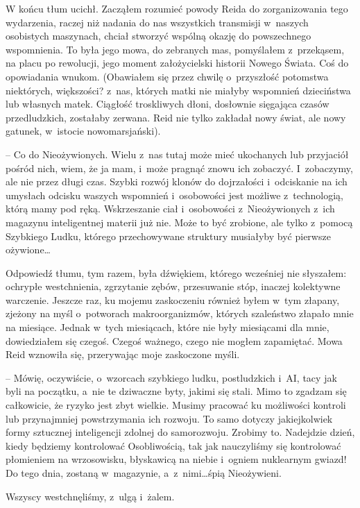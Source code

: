 \documentclass[oneside,polish,11pt,sfheadings]{mwbk}
\begin{document}
W końcu tłum ucichł. Zacząłem rozumieć powody Reida do zorganizowania
tego wydarzenia, raczej niż nadania do nas wszystkich transmisji w~naszych osobistych maszynach, chciał stworzyć wspólną okazję do
powszechnego wspomnienia. To była jego mowa, do zebranych mas,
pomyślałem z~przekąsem, na placu po rewolucji, jego moment założycielski
historii Nowego Świata. Coś do opowiadania wnukom. (Obawiałem się przez
chwilę o~przyszłość potomstwa niektórych, większości? z~nas, których
matki nie miałyby wspomnień dzieciństwa lub własnych matek. Ciągłość
troskliwych dłoni, dosłownie sięgająca czasów przedludzkich, zostałaby
zerwana. Reid nie tylko zakładał nowy świat, ale nowy gatunek, w~istocie
nowomarsjański).

-- Co do Nieożywionych. Wielu z~nas tutaj może mieć ukochanych lub
przyjaciół pośród nich, wiem, że ja mam, i~może pragnąć znowu ich
zobaczyć. I~zobaczymy, ale nie przez długi czas. Szybki rozwój klonów do
dojrzałości i~odciskanie na ich umysłach odcisku waszych wspomnień i~osobowości jest możliwe z~technologią, którą mamy pod ręką. Wskrzeszanie
ciał i~osobowości z~Nieożywionych z~ich magazynu inteligentnej materii
już nie. Może to być zrobione, ale tylko z~pomocą Szybkiego Ludku,
którego przechowywane struktury musiałyby być pierwsze ożywione\ldots

Odpowiedź tłumu, tym razem, była dźwiękiem, którego wcześniej nie
słyszałem: ochrypłe westchnienia, zgrzytanie zębów, przesuwanie stóp,
inaczej kolektywne warczenie. Jeszcze raz, ku mojemu zaskoczeniu również
byłem w~tym złapany, zjeżony na myśl o~potworach makroorganizmów,
których szaleństwo złapało mnie na miesiące. Jednak w~tych miesiącach,
które nie były miesiącami dla mnie, dowiedziałem się czegoś. Czegoś
ważnego, czego nie mogłem zapamiętać. Mowa Reid wznowiła się,
przerywając moje zaskoczone myśli.

-- Mówię, oczywiście, o~wzorcach szybkiego ludku, postludzkich i~AI, tacy
jak byli na początku, a~nie te dziwaczne byty, jakimi się stali. Mimo to
zgadzam się całkowicie, że ryzyko jest zbyt wielkie. Musimy pracować ku
możliwości kontroli lub przynajmniej powstrzymania ich rozwoju. To samo
dotyczy jakiejkolwiek formy sztucznej inteligencji zdolnej do
samorozwoju. Zrobimy to. Nadejdzie dzień, kiedy będziemy kontrolować
Osobliwością, tak jak nauczyliśmy się kontrolować płomieniem na
wrzosowisku, błyskawicą na niebie i~ogniem nuklearnym gwiazd! Do tego
dnia, zostaną w~magazynie, a~z~nimi\ldots śpią Nieożywieni.

Wszyscy westchnęliśmy, z~ulgą i~żalem.
\end{document}
